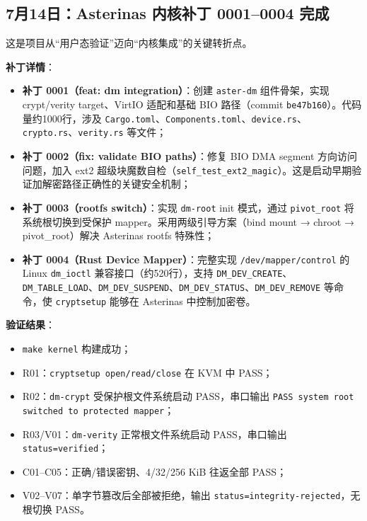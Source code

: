 \subsection{7月14日：Asterinas 内核补丁 0001--0004 完成}

这是项目从“用户态验证”迈向“内核集成”的关键转折点。

\textbf{补丁详情}：
\begin{itemize}
    \item \textbf{补丁 0001（feat: dm integration）}：创建 \texttt{aster-dm} 组件骨架，实现 crypt/verity target、VirtIO 适配和基础 BIO 路径（commit \texttt{be47b160}）。代码量约1000行，涉及 \texttt{Cargo.toml}、\texttt{Components.toml}、\texttt{device.rs}、\texttt{crypto.rs}、\texttt{verity.rs} 等文件；
    \item \textbf{补丁 0002（fix: validate BIO paths）}：修复 BIO DMA segment 方向访问问题，加入 ext2 超级块魔数自检（\texttt{self\_test\_ext2\_magic}）。这是启动早期验证加解密路径正确性的关键安全机制；
    \item \textbf{补丁 0003（rootfs switch）}：实现 \texttt{dm-root} init 模式，通过 \texttt{pivot\_root} 将系统根切换到受保护 mapper。采用两级引导方案（bind mount → chroot → pivot\_root）解决 Asterinas rootfs 特殊性；
    \item \textbf{补丁 0004（Rust Device Mapper）}：完整实现 \texttt{/dev/mapper/control} 的 Linux \texttt{dm\_ioctl} 兼容接口（约520行），支持 \texttt{DM\_DEV\_CREATE}、\texttt{DM\_TABLE\_LOAD}、\texttt{DM\_DEV\_SUSPEND}、\texttt{DM\_DEV\_STATUS}、\texttt{DM\_DEV\_REMOVE} 等命令，使 \texttt{cryptsetup} 能够在 Asterinas 中控制加密卷。
\end{itemize}

\textbf{验证结果}：
\begin{itemize}
    \item \texttt{make kernel} 构建成功；
    \item R01：\texttt{cryptsetup open/read/close} 在 KVM 中 PASS；
    \item R02：\texttt{dm-crypt} 受保护根文件系统启动 PASS，串口输出 \texttt{PASS system root switched to protected mapper}；
    \item R03/V01：\texttt{dm-verity} 正常根文件系统启动 PASS，串口输出 \texttt{status=verified}；
    \item C01--C05：正确/错误密钥、4/32/256 KiB 往返全部 PASS；
    \item V02--V07：单字节篡改后全部被拒绝，输出 \texttt{status=integrity-rejected}，无根切换 PASS。
\end{itemize}

